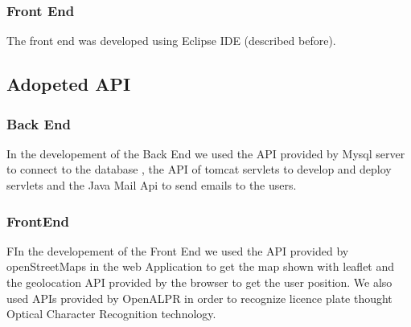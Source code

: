 \subsubsection{Front End}
The front end was developed using Eclipse IDE (described before).


\subsection{Adopeted API}
\subsubsection{Back End}
In the developement of the Back End we used the API provided by Mysql server to connect to the database , the API of tomcat servlets to develop and deploy servlets and the Java Mail Api to send emails to the users.
\subsubsection{FrontEnd}
FIn the developement of the Front End we used the API provided by openStreetMaps in the web Application to get the map shown with leaflet and the geolocation API provided by the browser to get the user position. We also used APIs provided by OpenALPR in order to recognize licence plate thought Optical Character Recognition technology.


